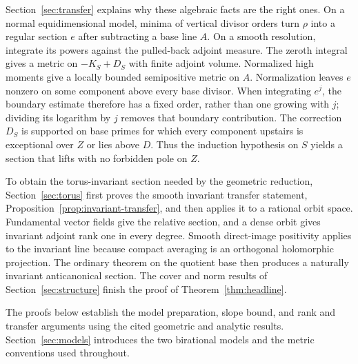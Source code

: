 Section~\ref{sec:transfer} explains why these algebraic facts are the
right ones. On a normal equidimensional model, minima of vertical
divisor orders turn $\rho$ into a regular section $e$ after subtracting a
base line $A$. On a smooth resolution, integrate its powers against
the pulled-back adjoint measure. The zeroth integral gives a metric on
$-K_S+D_S$ with finite adjoint volume. Normalized high moments give a
locally bounded semipositive metric on $A$. Normalization leaves $e$
nonzero on some component above every base divisor. When integrating
$e^j$, the boundary estimate therefore has a fixed order, rather than
one growing with $j$; dividing its logarithm by $j$ removes that
boundary contribution. The correction $D_S$ is
supported on base primes for which every component upstairs is exceptional over
$Z$ or lies above $D$. Thus the induction hypothesis on $S$ yields a
section that lifts with no forbidden pole on $Z$.

To obtain the torus-invariant section needed by the geometric reduction,
Section~\ref{sec:torus} first proves the smooth invariant transfer
statement, Proposition~\ref{prop:invariant-transfer}, and then applies
it to a rational orbit space.
Fundamental vector fields give the relative section, and a dense orbit
gives invariant adjoint rank one in every degree. Smooth direct-image
positivity applies to the invariant line because compact averaging is
an orthogonal holomorphic projection. The ordinary theorem on the
quotient base then produces a naturally invariant anticanonical section.
The cover and norm results of Section~\ref{sec:structure} finish the
proof of Theorem~\ref{thm:headline}.

The proofs below establish the model preparation, slope bound, and
rank and transfer arguments using the cited geometric and analytic results.
Section~\ref{sec:models} introduces the two birational models and the
metric conventions used throughout.
